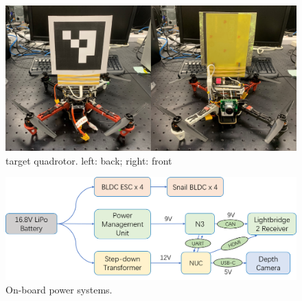 \begin{figure}[ht]
  \centering
  \includegraphics[width=1.0\textwidth]{figure/chapter_4/target_uav.png}
  \caption{target quadrotor. left: back; right: front}
  \label{fig:target_uav}
\end{figure}

\begin{table}[htb]
  \centering
  \caption{Weight and power consumption of components on the quadrotor}
  \label{tb:weight_power}
\end{table}

\begin{figure}[ht]
  \centering
  \includegraphics[width=1.0\textwidth]{figure/chapter_4/power_system.png}
  \caption{On-board power systems.}
  \label{fig:power_systems}
\end{figure}

